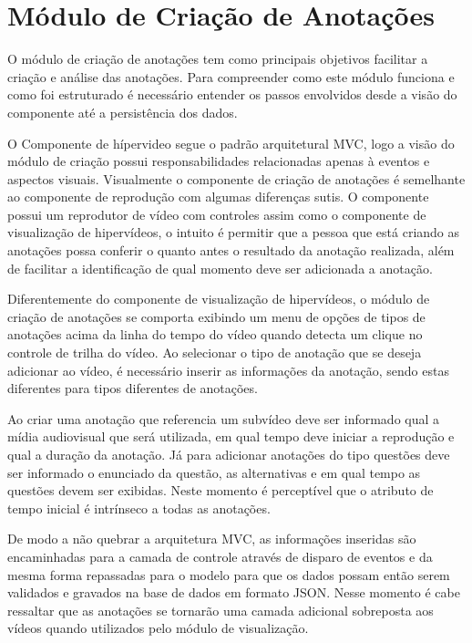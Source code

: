 \section{Módulo de Criação de Anotações}

O módulo de criação de anotações tem como principais objetivos facilitar a criação e análise das anotações. Para compreender como este módulo funciona e como foi estruturado é necessário entender os passos envolvidos desde a visão do componente até a persistência dos dados.

O Componente de hípervideo segue o padrão arquitetural MVC, logo a visão do módulo de criação possui responsabilidades relacionadas apenas à eventos e aspectos visuais. Visualmente o componente de criação de anotações é semelhante ao componente de reprodução com algumas diferenças sutis. O componente possui um reprodutor de vídeo com controles assim como o componente de visualização de hipervídeos, o intuito é permitir que a pessoa que está criando as anotações possa conferir o quanto antes o resultado da anotação realizada, além de facilitar a identificação de qual momento deve ser adicionada a anotação.

Diferentemente do componente de visualização de hipervídeos, o módulo de criação de anotações se comporta exibindo um menu de opções de tipos de anotações acima da linha do tempo do vídeo quando detecta um clique no controle de trilha do vídeo. Ao selecionar o tipo de anotação que se deseja adicionar ao vídeo, é necessário inserir as informações da anotação, sendo estas diferentes para tipos diferentes de anotações.

Ao criar uma anotação que referencia um subvídeo deve ser informado qual a mídia audiovisual que será utilizada, em qual tempo deve iniciar a reprodução e qual a duração da anotação. Já para adicionar anotações do tipo questões deve ser informado o enunciado da questão, as alternativas e em qual tempo as questões devem ser exibidas. Neste momento é perceptível que o atributo de tempo inicial é intrínseco a todas as anotações.

De modo a não quebrar a arquitetura MVC, as informações inseridas são encaminhadas para a camada de controle através de disparo de eventos e da mesma forma repassadas para o modelo para que os dados possam então serem validados e gravados na base de dados em formato JSON. Nesse momento é cabe ressaltar que as anotações se tornarão uma camada adicional sobreposta aos vídeos quando utilizados pelo módulo de visualização.

